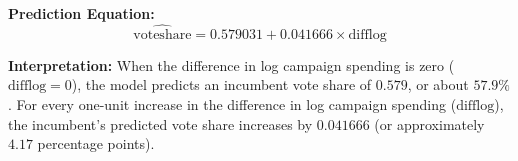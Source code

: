 \documentclass[12pt,letterpaper]{article}
\begin{document}
\begin{enumerate}
		\textbf{Prediction Equation:}
		$$\widehat{\text{voteshare}} = 0.579031 + 0.041666 \times \text{difflog}$$
		
		
	
				\textbf{Interpretation:} 	
		When the difference in log campaign spending is zero ($\text{difflog} = 0$), the model predicts an incumbent vote share of $0.579$, or about $57.9\%$. For every one-unit increase in the difference in log campaign spending ($\text{difflog}$), the incumbent's predicted vote share increases by $0.041666$ (or approximately $4.17$ percentage points).
	\end{enumerate}
	
	\newpage
	
\end{document}
